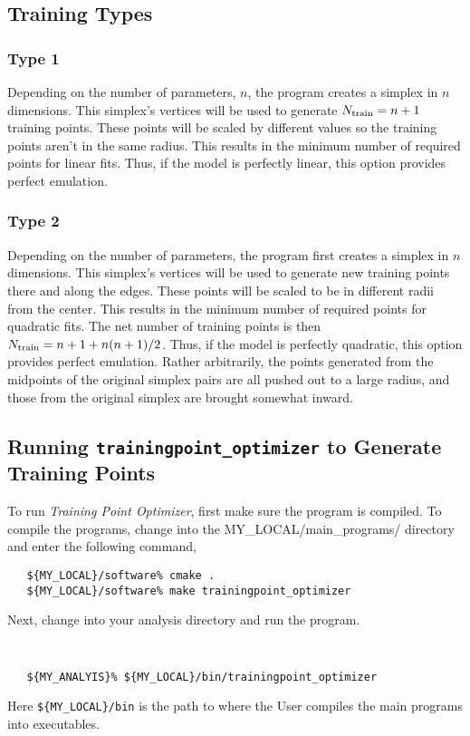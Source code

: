 \documentclass[UserManual.tex]{subfiles}
\begin{document}
\subsection{Training Types}

\subsubsection{Type 1}
 Depending on the number of parameters, $n$, the program creates a simplex in $n$ dimensions. This simplex's vertices will be used to generate $N_{\rm train}=n+1$ training points. These points will be scaled by different values so the training points aren't in the same radius. This results in the minimum number of required points for linear fits. Thus, if the model is perfectly linear, this option provides perfect emulation. 
 \subsubsection{Type 2}

 Depending on the number of parameters, the program first creates a simplex in $n$ dimensions. This simplex's vertices will be used to generate new training points there and along the edges. These points will be scaled to be in different radii from the center. This results in the minimum number of required points for quadratic fits. The net number of training points is then $N_{\rm train}=n+1+n(n+1)/2$.  Thus, if the model is perfectly quadratic, this option provides perfect emulation. Rather arbitrarily, the points generated from the midpoints of the original simplex pairs are all pushed out to a large radius, and those from the original simplex are brought somewhat inward.
 
\subsection{Running {\tt trainingpoint\_optimizer} to Generate Training Points}

To run {\it Training Point Optimizer}, first make sure the program is compiled. To compile the programs, change into the {MY\_LOCAL/main\_programs/} directory and enter the following command,

\begin{verbatim}
   ${MY_LOCAL}/software% cmake .
   ${MY_LOCAL}/software% make trainingpoint_optimizer
\end{verbatim}

Next, change into your analysis directory and run the program.
{\tt
\begin{verbatim}
   ${MY_ANALYIS}% ${MY_LOCAL}/bin/trainingpoint_optimizer 
\end{verbatim}
}
Here {\tt \$\{MY\_LOCAL\}/bin} is the path to where the User compiles the main programs into executables. 
\end{document}
